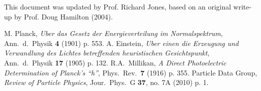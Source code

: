 \documentclass{revtex4}
\begin{document}
\begin{acknowledgments}
This document was updated by Prof. Richard Jones, based on an original
write-up by Prof. Doug Hamilton (2004).
\end{acknowledgments}

%

\begin{thebibliography}{9}

M. Planck, {\em Uber das Gesetz der Energieverteilung im Normalspektrum},
Ann.\ d.\ Physik {\bf 4} (1901) p. 553.
A. Einstein, {\em Uber einen die Erzeugung und Verwandlung des Lichtes
betreffenden heuristischen Gesichtspunkt}, Ann.\ d.\ Physik {\bf 17} (1905)
p. 132.
R.A.~Millikan, {\em A Direct Photoelectric Determination of Planck's ``h''},
Phys.\ Rev.\ {\bf 7} (1916) p. 355.
Particle Data Group, {\em Review of Particle Physics}, Jour.\ Phys.\ G
{\bf 37}, no. 7A (2010) p. 1.
\end{thebibliography}
\end{document}
